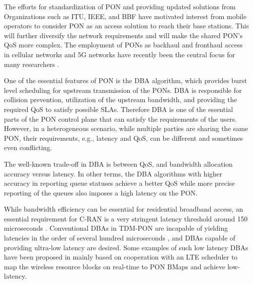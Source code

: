 The efforts for standardization of \ac{PON} and providing updated solutions from Organizations such as \ac{ITU}, \ac{IEEE}, and \ac{BBF} have motivated interest from mobile operators to consider \ac{PON} as an access solution to reach their base stations. This will further diversify the network requirements and will make the shared \ac{PON}'s \ac{QoS} more complex. The employment of \acp{PON} as backhaul and fronthaul access in cellular networks and \ac{5G} networks have recently been the central focus for many researchers \cite{7121508,Fiorani2015}.


One of the essential features of \ac{PON} is the \ac{DBA} algorithm, which provides burst level scheduling for upstream transmission of the \acp{PON}. \ac{DBA} is responsible for collision prevention, utilization of the upstream bandwidth, and providing the required \ac{QoS} to satisfy possible \acp{SLA}. Therefore \ac{DBA} is one of the essential parts of the \ac{PON} control plane that can satisfy the requirements of the users. However, in a heterogeneous scenario, while multiple parties are sharing the same \ac{PON}, their requirements, e.g., latency and \ac{QoS}, can be different and sometimes even conflicting. %

The well-known trade-off in \ac{DBA} is between \ac{QoS}, and bandwidth allocation accuracy versus latency. In other terms, the \ac{DBA} algorithms with higher accuracy in reporting queue statuses achieve a better \ac{QoS} while more precise reporting of the queues also imposes a high latency on the \ac{PON}.

While bandwidth efficiency can be essential for residential broadband access, an essential requirement for \ac{C-RAN} is a very stringent latency threshold around 150 microseconds \cite{7456186}. Conventional \acp{DBA} in TDM-PON are incapable of yielding latencies in the order of several hundred microseconds \cite{6950589}, and \acp{DBA} capable of providing ultra-low latency are desired. Some examples of such low latency \acp{DBA} have been proposed in \cite{6886953,7511482,Zhou:17} mainly based on cooperation with an LTE scheduler to map the wireless resource blocks on real-time to \ac{PON} \acp{BMap} and achieve low-latency.


